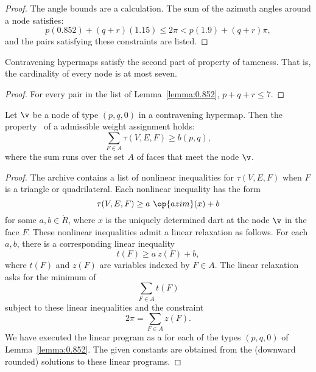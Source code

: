 \begin{proof}
The angle bounds are a calculation.  The sum of the azimuth angles
around a node satisfies:
\[ 
p (0.852) + (q+r) (1.15) \le 2\pi < p (1.9) + (q+r) \pi,
\] 
and the pairs satisfying these constraints are listed.
\end{proof}

\begin{lemma}[]\label{lemma:node-upper}
Contravening hypermaps satisfy the second part of property 
of tameness.  That is, the cardinality of every
node is at most seven.
\end{lemma}

\begin{proof}  For every pair in the list of Lemma~\ref{lemma:0.852},  $p+q+r\le 7$.
\end{proof}




\begin{lemma}[] \label{lemma:weightB}
  Let $\v$ be a node of type $(p,q,0)$ in a contravening hypermap.
  Then the property~ of a admissible weight assignment
  holds:
\[ 
\sum_{ F\in A} \tau(V,E,F) \ge  b(p,q),
\] 
where the sum runs over the set $A$ of faces that meet the node $\v$.
\end{lemma}
%
%

\begin{proof}   The archive
  \cite[FUSDSPJ]{hales:2009:nonlinear} contains a list of nonlinear
  inequalities for $\tau(V,E,F)$ when $F$ is a triangle or
  quadrilateral. Each nonlinear inequality has the form
\[ \tau(V,E,F) \ge a~\op{azim}(x) + b\] 
for some $a,b\in\ring{R}$, where $x$ is the uniquely determined dart
at the node $\v$ in the face $F$.  These nonlinear inequalities admit
a linear relaxation as follows.  For each $a,b$, there is a corresponding
linear inequality %
%
\[ 
t(F) \ge a~z(F) + b,
\] 
where $t(F)$ and $z(F)$ are variables indexed by $F\in A$.
%
%
%
The linear relaxation asks for the minimum of 
\[ \sum_{F\in A} t(F)\] 
subject to these linear inequalities and the constraint
\[ 
2\pi = \sum_{F\in A} z(F).
\] 
We have executed the linear program as a 
 for each of the
types $(p,q,0)$ of Lemma~\ref{lemma:0.852}. The given constants are
obtained from the (downward rounded) solutions to these linear
programs.
\end{proof}

